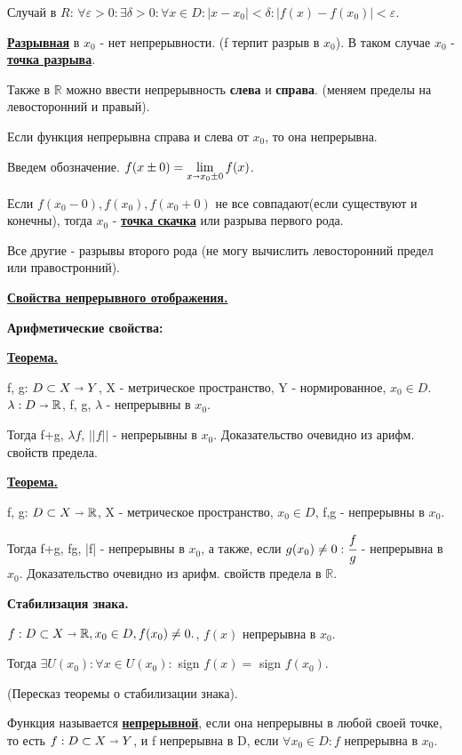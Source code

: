 \documentclass{article}
\newcommand{\deff}[1]{\underline{\textbf{#1}}}
\newcommand{\thmm}[1]{\underline{\textbf{#1}}}
\begin{document}
Случай в $R$:   $\forall \varepsilon>0:\exists \delta>0: \forall x \in D: |x-x_0|<\delta: |f(x)-f(x_0)|<\varepsilon$.

\deff{Разрывная} в $x_0$ - нет непрерывности. (f терпит разрыв в $x_0$). В таком случае $x_0$ - \deff{точка разрыва}. 

Также в $\mathbb{R}$ можно ввести непрерывность \textbf{слева} и \textbf{справа}. (меняем пределы на левосторонний и правый).

Если функция непрерывна справа и слева от $x_0$, то она непрерывна.

Введем обозначение. $f(x\pm0)=\lim\limits_{x\shortrightarrow x_0 \pm 0}f(x)$.

Если $f(x_0-0),f(x_0),f(x_0+0)$ не все совпадают(если существуют и конечны), тогда $x_0$ - \deff{точка скачка} или разрыва первого рода.

Все другие - разрывы второго рода (не могу вычислить левосторонний предел или правостронний).


\deff{Свойства непрерывного отображения.}

\textbf{Арифметические свойства:}

\thmm{Теорема.}

f, g: $D \subset X \shortrightarrow Y$, X - метрическое пространство, Y - нормированное, $x_0 \in D$. $\lambda: D \shortrightarrow \mathbb{R}$, f, g, $\lambda$ - непрерывны в $x_0$. 

Тогда f+g, $\lambda f$, $||f||$ - непрерывны в $x_0$. Доказательство очевидно из арифм. свойств предела.

\thmm{Теорема.}

f, g: $D \subset X \shortrightarrow \mathbb{R}$, X - метрическое пространство, $x_0 \in D$, f,g - непрерывны в $x_0$. 

Тогда f+g, fg, |f| - непрерывны в $x_0$, а также, если $g(x_0)\neq 0: \cfrac{f}{g}$ - непрерывна в $x_0$. Доказательство очевидно из арифм. свойств предела в $\mathbb{R}$.

\textbf{Стабилизация знака.}

$f: D \subset X \shortrightarrow \mathbb{R}, x_0 \in D, f(x_0)\neq 0.$, $f(x)$ непрерывна в $x_0$.

Тогда $\exists U(x_0): \forall x \in U(x_0): $ sign $ f(x) = $ sign $f(x_0)$.

(Пересказ теоремы о стабилизации знака).

Функция называется \deff{непрерывной}, если она непрерывны в любой своей точке, то есть $f: D \subset X \shortrightarrow Y$, и f непрерывна в D, если $\forall x_0 \in D: f$ непрерывна в $x_0$.
\end{document}
